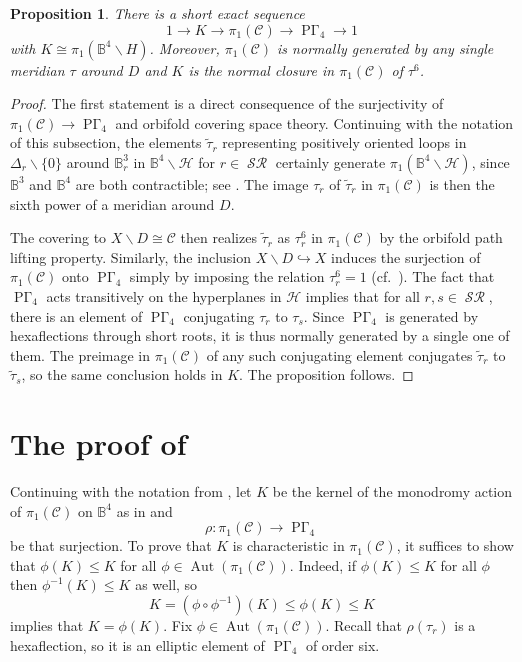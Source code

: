 \documentclass[11pt]{amsart}
\theoremstyle{plain}
\newtheorem{prop}[thm]{Proposition}
\theoremstyle{definition}
\theoremstyle{remark}
\newcommand{\bbB}{\mathbb{B}}
\newcommand{\calC}{\mathcal{C}}
\newcommand{\calH}{\mathcal{H}}
\newcommand{\Del}{\Delta}
\DeclareMathOperator{\Aut}{Aut}
\newcommand{\lra}{\longrightarrow}
\newcommand{\ssm}{\smallsetminus}
\DeclareMathOperator{\PGam}{\mathrm{P}\Gamma}
\DeclareMathOperator{\SR}{\mathcal{SR}}
\newcommand{\wt}{\widetilde}
\newenvironment{pf}{\begin{proof}}{\end{proof}}
\begin{document}
\begin{prop}\label{prop:exact_sequence}
There is a short exact sequence
	\begin{equation}\label{eq:exact_sequence}
	1 \lra K \lra \pi_1(\calC) \lra \PGam_4 \lra 1
	\end{equation}
with $K\cong\pi_1(\bbB^4 \ssm H)$. Moreover, $\pi_1(\calC)$ is normally generated by any single meridian $\tau$ around $D$ and $K$ is the normal closure in $\pi_1(\calC)$ of $\tau^6$.
\end{prop}
\begin{pf}
The first statement is a direct consequence of the surjectivity of $\pi_1(\calC) \to \PGam_4$ and orbifold covering space theory. Continuing with the notation of this subsection, the elements $\wt{\tau}_r$ representing positively oriented loops in $\Del_r \ssm \{0\}$ around $\bbB^3_r$ in $\bbB^4 \ssm \calH$ for $r \in \SR$ certainly generate $\pi_1(\bbB^4 \ssm \calH)$, since $\bbB^3$ and $\bbB^4$ are both contractible; see \cite{ACTorthogonal}. The image $\tau_r$ of $\wt{\tau}_r$ in $\pi_1(\calC)$ is then the sixth power of a meridian around $D$.

The covering to $X \ssm D \cong \calC$ then realizes $\wt{\tau}_r$ as $\tau_r^6$ in $\pi_1(\calC)$ by the orbifold path lifting property. Similarly, the inclusion $X \ssm D\hookrightarrow X$ induces the surjection of $\pi_1(\calC)$ onto $\PGam_4$ simply by imposing the relation $\tau_r^6 = 1$ (cf.\ \cite[\S 3]{zbMATH05254786}). The fact that $\PGam_4$ acts transitively on the hyperplanes in $\calH$ implies that for all $r, s \in \SR$, there is an element of $\PGam_4$ conjugating $\tau_r$ to $\tau_s$. Since $\PGam_4$ is generated by hexaflections through short roots, it is thus normally generated by a single one of them. The preimage in $\pi_1(\calC)$ of any such conjugating element conjugates $\wt{\tau}_r$ to $\wt{\tau}_s$, so the same conclusion holds in $K$. The proposition follows.
\end{pf}

\section{The proof of }\label{sec:CharProof}

Continuing with the notation from , let $K$ be the kernel of the monodromy action of $\pi_1(\calC)$ on $\bbB^4$ as in  and
	\[
		\rho : \pi_1(\calC) \to \PGam_4
	\]
be that surjection. To prove that $K$ is characteristic in $\pi_1(\calC)$, it suffices to show that $\phi(K)\leq K$ for all $\phi \in \Aut(\pi_1(\calC))$. Indeed, if $\phi(K) \le K$ for all $\phi$ then $\phi^{-1}(K)\leq K$ as well, so
	\[
	K=(\phi\circ\phi^{-1})(K)\leq\phi(K)\leq K
	\]
implies that $K=\phi(K)$. Fix $\phi \in \Aut(\pi_1(\calC))$. Recall that $\rho(\tau_r)$ is a hexaflection, so it is an elliptic element of $\PGam_4$ of order six.
\end{document}
